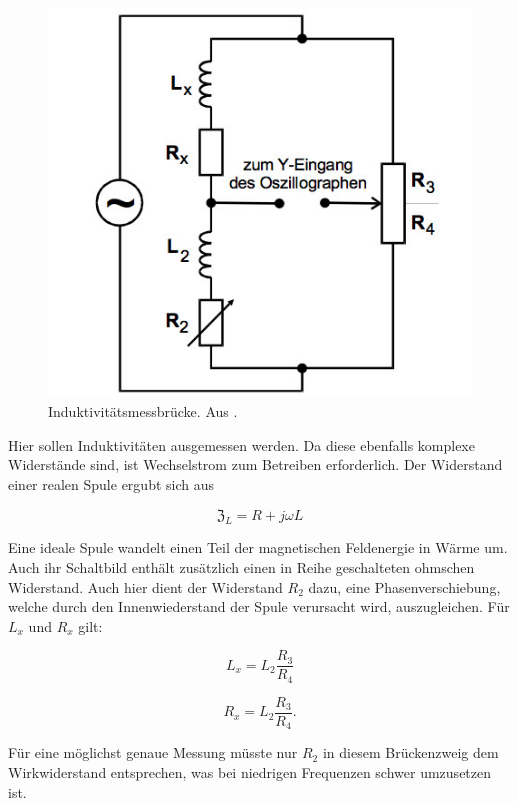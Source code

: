 \begin{figure}
  \centering
  \includegraphics[scale=0.5]{content/induktivitätsmessbrücke.jpg}
  \caption{Induktivitätsmessbrücke. Aus \cite{anleitung302}.}
  \label{fig:induktivität}
\end{figure}

Hier sollen Induktivitäten ausgemessen werden. Da diese ebenfalls komplexe Widerstände sind, ist Wechselstrom zum Betreiben erforderlich.
Der Widerstand einer realen Spule ergubt sich aus

\begin{equation}
  \mathfrak{Z}_L = R + j\omega L
\end{equation}


Eine ideale Spule wandelt einen Teil der magnetischen Feldenergie in Wärme um. Auch ihr Schaltbild enthält zusätzlich einen in Reihe geschalteten ohmschen Widerstand.
Auch hier dient der Widerstand $R_{2}$ dazu, eine Phasenverschiebung, welche durch den Innenwiederstand der Spule verursacht wird, auszugleichen.
Für $L_x$ und $R_x$ gilt:

\begin{equation}
  \label{eqn:ind1}
  L_x = L_{2} \frac{R_3}{R_4}
\end{equation}

\begin{equation}
  \label{eqn:ind2}
  R_x = L_{2} \frac{R_3}{R_4}.
\end{equation}

Für eine möglichst genaue Messung müsste nur $R_{2}$ in diesem Brückenzweig dem Wirkwiderstand entsprechen, was bei niedrigen Frequenzen schwer umzusetzen ist.

